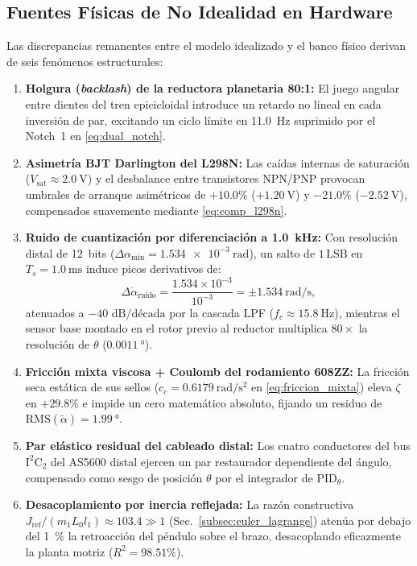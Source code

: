 \subsection{Fuentes Físicas de No Idealidad en Hardware}\label{subsec:fuentes_no_idealidad}

Las discrepancias remanentes entre el modelo idealizado y el banco físico derivan de seis fenómenos estructurales:
\begin{enumerate}
    \item \textbf{Holgura (\textit{backlash}) de la reductora planetaria 80:1:} El juego angular entre dientes del tren epicicloidal introduce un retardo no lineal en cada inversión de par, excitando un ciclo límite en \qty{11.0}{\hertz} suprimido por el Notch~1 en \eqref{eq:dual_notch}.
    \item \textbf{Asimetría BJT Darlington del L298N:} Las caídas internas de saturación ($V_{\text{sat}}\approx\qty{2.0}{\volt}$) y el desbalance entre transistores NPN/PNP provocan umbrales de arranque asimétricos de $+10.0\%$ ($+\qty{1.20}{\volt}$) y $-21.0\%$ ($-\qty{2.52}{\volt}$), compensados suavemente mediante \eqref{eq:comp_l298n}.
    \item \textbf{Ruido de cuantización por diferenciación a \qty{1.0}{\kilo\hertz}:} Con resolución distal de 12~bits ($\Delta\alpha_{\min}=\qty{1.534e-3}{\radian}$), un salto de $1\,\mathrm{LSB}$ en $T_s=\qty{1.0}{\milli\second}$ induce picos derivativos de:
    \begin{equation}
        \Delta\dot{\alpha}_{\text{ruido}} = \frac{1.534\times 10^{-3}}{10^{-3}} = \pm\qty{1.534}{\radian\per\second},
        \label{eq:ruido_derivativo}
    \end{equation}
    atenuados a $-40\text{ dB/década}$ por la cascada LPF ($f_c\approx\qty{15.8}{\hertz}$), mientras el sensor base montado en el rotor previo al reductor multiplica $80\times$ la resolución de $\theta$ ($\qty{0.0011}{\degree}$).
    \item \textbf{Fricción mixta viscosa + Coulomb del rodamiento 608ZZ:} La fricción seca estática de sus sellos ($c_c=\qty{0.6179}{\radian\per\second\squared}$ en \eqref{eq:friccion_mixta}) eleva $\zeta$ en $+29.8\%$ e impide un cero matemático absoluto, fijando un residuo de $\mathrm{RMS}(\tilde{\alpha})=\qty{1.99}{\degree}$.
    \item \textbf{Par elástico residual del cableado distal:} Los cuatro conductores del bus $\text{I}^2\text{C}_2$ del AS5600 distal ejercen un par restaurador dependiente del ángulo, compensado como sesgo de posición $\theta$ por el integrador de $\text{PID}_\theta$.
    \item \textbf{Desacoplamiento por inercia reflejada:} La razón constructiva $J_{\text{ref}}/(m_1 L_0 l_1) \approx 103.4 \gg 1$ (Sec.~\ref{subsec:euler_lagrange}) atenúa por debajo del \qty{1}{\percent} la retroacción del péndulo sobre el brazo, desacoplando eficazmente la planta motriz ($R^2=98.51\%$).
\end{enumerate}

